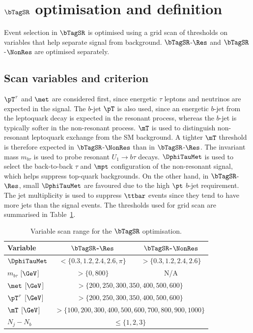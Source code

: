 \section[$\bTagSR$ optimisation and definition]{$\bTagSR$ optimisation and definition}
\label{sec:ch7_sr1b}

Event selection in $\bTagSR$ is optimised using a grid scan of thresholds on variables that help separate signal from background. $\bTagSR$-$\Res$ and $\bTagSR$-$\NonRes$ are optimised separately.

\subsection{Scan variables and criterion}
\label{subsec:ch7_scan}

$\pT^\tau$ and $\met$ are considered first, since energetic $\tau$ leptons and neutrinos are expected in the signal.
The $b$-jet $\pT$ is also used, since an energetic $b$-jet from the leptoquark decay is expected in the resonant process, whereas the $b$-jet is typically softer in the non-resonant process. 
$\mT$ is used to distinguish non-resonant leptoquark exchange from the SM background.
A tighter $\mT$ threshold is therefore expected in $\bTagSR$-$\NonRes$ than in $\bTagSR$-$\Res$.
The invariant mass $m_{b\tau}$ is used to probe resonant $U_1\to b\tau$ decays.
$\DphiTauMet$ is used to select the back-to-back $\tau$ and $\mpt$ configuration of the non-resonant signal, which helps suppress top-quark backgrounds.
On the other hand, in $\bTagSR$-$\Res$, small $\DphiTauMet$ are favoured due to the high $\pt$ $b$-jet requirement.
The jet multiplicity is used to suppress $\ttbar$ events since they tend to have more jets than the signal events.
The thresholds used for grid scan are summarised in Table~\ref{tab:ch7_scan_variables}.

\begin{table}[htbp]
    \centering
    \small
    \caption{Variable scan range for the $\bTagSR$ optimisation.}
    \label{tab:ch7_scan_variables}
    \begin{tabular}{lcc}
        \toprule
        Variable & $\bTagSR$-$\Res$ & $\bTagSR$-$\NonRes$ \\
        \midrule
        $\DphiTauMet$ & $<\{0.3,1.2,2.4,2.6,\pi\}$ & $>\{0.3,1.2,2.4,2.6\}$ \\
        $m_{b\tau}$ [$\GeV$] & $>\{0,800\}$ & N/A \\
        $\met$ [$\GeV$] & \multicolumn{2}{c}{$>\{200,250,300,350,400,500,600\}$} \\
        $\pT^\tau$ [$\GeV$] & \multicolumn{2}{c}{$>\{200,250,300,350,400,500,600\}$} \\
        $\mT$ [$\GeV$] & \multicolumn{2}{c}{$>\{100,200,300,400,500,600,700,800,900,1000\}$} \\
        $N_j-N_b$ & \multicolumn{2}{c}{$\leq\{1,2,3\}$} \\
        \bottomrule
    \end{tabular}
\end{table}

